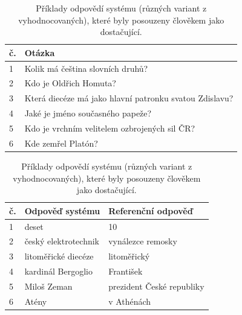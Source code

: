 \begin{table}[H]
\centering
\begin{tabular}{|l|l|}
\hline
\textbf{č.}   &\textbf{Otázka}                                         \\ \hline
1               &Kolik má čeština slovních druhů?                        \\ \hline
2                &Kdo je Oldřich Homuta?                                  \\ \hline
3                &Která diecéze má jako hlavní patronku svatou Zdislavu?  \\ \hline
4                &Jaké je jméno současného papeže?                        \\ \hline
5                &Kdo je vrchním velitelem ozbrojených sil ČR?            \\ \hline
6                & Kde zemřel Platón?                                      \\ \hline
\end{tabular}
\begin{tabular}{|l|l|l|}
\hline
\textbf{č.}   &\textbf{Odpověď systému} & \textbf{Referenční odpověď} \\ \hline
1               &deset                    & 10                          \\ \hline
2               &český elektrotechnik     & vynálezce remosky           \\ \hline
3               &litoměřické diecéze      & litoměřický                 \\ \hline
4               &kardinál Bergoglio       & František                   \\ \hline
5               &Miloš Zeman              & prezident České republiky   \\ \hline
6               &Atény                    & v Athénách                  \\ \hline
\end{tabular}
\caption{Příklady odpovědí systému (různých variant z vyhodnocovaných), které byly posouzeny člověkem jako dostačující.}
\label{tab:human_eval_examples}
\end{table}


